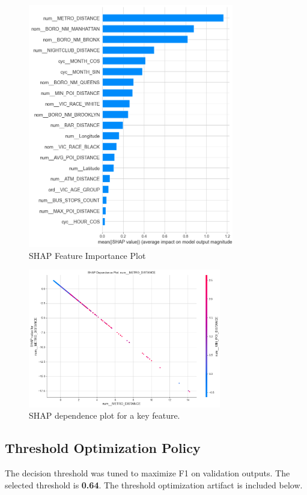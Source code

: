 \documentclass{article}
\begin{document}
\begin{figure}[H]
\centering
\includegraphics[width=0.8\textwidth]{LogisticRegression_shap_feature_importance.png}
\caption{SHAP Feature Importance Plot}
\end{figure}

\begin{figure}[H]
\centering
\includegraphics[width=0.75\textwidth]{LogisticRegression_shap_dependence.png}
\caption{SHAP dependence plot for a key feature.}
\end{figure}

\subsection{Threshold Optimization Policy}
\label{sec:threshold}
The decision threshold was tuned to maximize F1 on validation outputs. The selected threshold is \textbf{0.64}. The threshold optimization artifact is included below.
\end{document}

